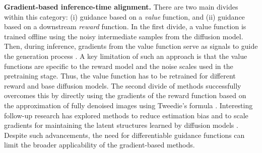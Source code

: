 \textbf{Gradient-based inference-time alignment.} 
There are two main divides within this category: (i) guidance based on a \emph{value} function, and (ii) guidance based on a downstream \emph{reward} function. In the first divide, a value function is trained offline using the noisy intermediate samples from the diffusion model. Then, during inference, gradients from the value function serve as signals to guide the generation process \citep{Dhariwal2021DiffusionSynthesis,Yuan2023Reward-DirectedImprovement}. A key limitation of such an approach is that the value functions are specific to the reward model and the noise scales used in the pretraining stage. Thus, the value function has to be retrained for different reward and base diffusion models. The second divide of methods successfully overcomes this by directly using the gradients of the reward function based on the approximation of fully denoised images using Tweedie's formula \citep{chung2022improving, Chung2023DiffusionProblems,yu2023freedom}. Interesting follow-up research has explored methods to reduce estimation bias \citep{zhu2023denoising,Bansal2024UniversalModels,he2024manifold} and to scale gradients for maintaining the latent structures learned by diffusion models \citep{Guo2024GradientPerspective}. Despite such advancements, the need for differentiable guidance functions can limit the broader applicability of the gradient-based methods.

